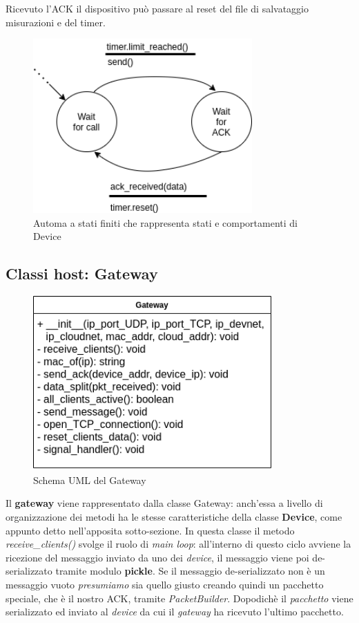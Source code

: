 \documentclass[a4paper,12pt]{report}
\begin{document}
Ricevuto l'ACK il dispositivo può passare al reset del file di salvataggio misurazioni e del timer.

\begin{figure}[H]
\centering{}
\includegraphics[width=.8\textwidth,height=18em]{img/FSM_Device.png}
\caption{Automa a stati finiti che rappresenta stati e comportamenti di Device}
\label{img:fsm_device}
\end{figure}

\subsection{Classi host: Gateway}

\begin{figure}[H]
\centering{}
\includegraphics[width=.7\textwidth,height=18em]{img/UML_Gateway.png}
\caption{Schema UML del Gateway}
\label{img:uml_gateway}
\end{figure}

Il \textbf{gateway} viene rappresentato dalla classe Gateway: anch'essa a livello di organizzazione dei metodi ha le stesse caratteristiche della classe \textbf{Device}, come appunto detto nell'apposita sotto-sezione.
%
In questa classe il metodo \emph{receive\_clients()} svolge il ruolo di \emph{main loop}: all'interno di questo ciclo avviene la ricezione del messaggio inviato da uno dei \emph{device}, il messaggio viene poi de-serializzato tramite modulo \textbf{pickle}.
%
Se il messaggio de-serializzato non è un messaggio vuoto \emph{presumiamo} sia quello giusto creando quindi un pacchetto speciale, che è il nostro ACK,  tramite \emph{PacketBuilder}.
Dopodichè il \emph{pacchetto} viene serializzato ed inviato al \emph{device} da cui il \emph{gateway} ha ricevuto l'ultimo pacchetto.
\end{document}
